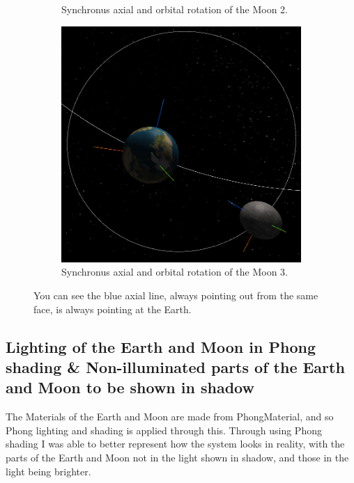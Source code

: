 \documentclass[12pt]{article}
\begin{document}
\begin{figure}[H]
\begin{subfigure}[b]{0.38\textwidth}
                \caption{Synchronus axial and orbital rotation of the Moon 2.}
                \label{fig: Synchronus axial and orbital rotation of the Moon.}
	 \end{subfigure}
	 \begin{subfigure}[b]{0.38\textwidth}
                \includegraphics[width=\textwidth]{images/syncrotation3}
                \caption{Synchronus axial and orbital rotation of the Moon 3.}
                \label{fig: Synchronus axial and orbital rotation of the Moon.}
	 \end{subfigure}
	 \caption{You can see the blue axial line, always pointing out from the same face, is always pointing at the Earth.}
\end{figure}

\subsection{Lighting of the Earth and Moon in Phong shading \& Non-illuminated parts of the Earth and Moon to be shown in shadow}
The Materials of the Earth and Moon are made from PhongMaterial, and so Phong lighting and shading is applied through this. Through using Phong shading I was able to better represent how the system looks in reality, with the parts of the Earth and Moon not in the light shown in shadow, and those in the light being brighter.
\end{document}
